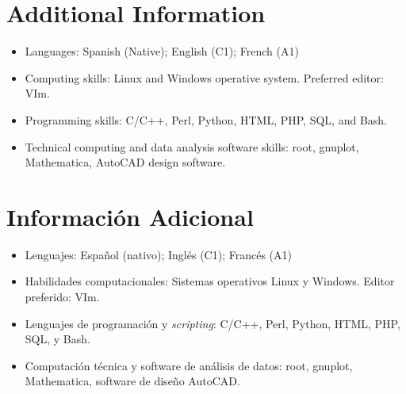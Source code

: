 \ifeng
\section*{Additional Information}

\begin{itemize}
  \item Languages: Spanish (Native); English (C1); French (A1)
  \item Computing skills: Linux and Windows operative system. Preferred editor: VIm.
  \item Programming skills: C/C++, Perl, Python, HTML, PHP, SQL, and Bash.
  \item Technical computing and data analysis software skills: root, gnuplot, Mathematica, AutoCAD design software.
\end{itemize}
\else
\section*{Información Adicional}

\begin{itemize}
	\item Lenguajes: Español (nativo); Inglés (C1); Francés (A1)
\item Habilidades computacionales: Sistemas operativos Linux y Windows. Editor preferido: VIm.
\item Lenguajes de programación y {\emph{scripting}}: C/C++, Perl, Python, HTML, PHP, SQL, y Bash.
\item Computación técnica y software de análisis de datos: root, gnuplot, Mathematica, software de diseño AutoCAD. 
\end{itemize}
\fi

